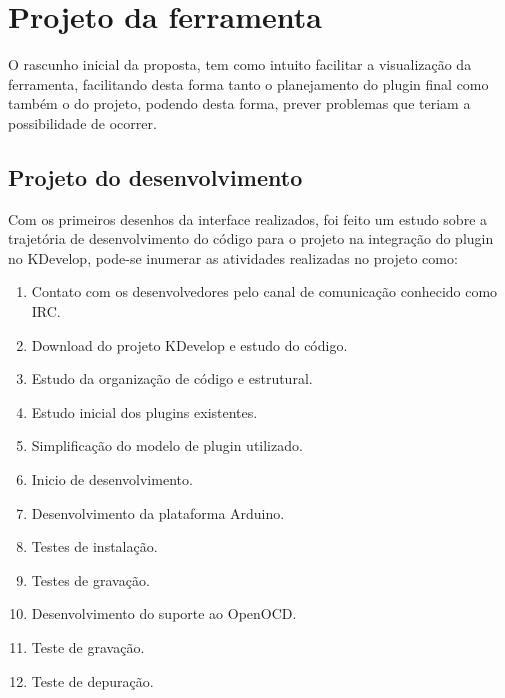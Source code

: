 \chapter{Projeto da ferramenta}
O rascunho inicial da proposta, tem como intuito facilitar a visualização da ferramenta, facilitando desta forma tanto o planejamento do plugin final como também o do projeto, podendo desta forma, prever problemas que teriam a possibilidade de ocorrer.



\section{Projeto do desenvolvimento}
Com os primeiros desenhos da interface realizados, foi feito um estudo sobre a trajetória de desenvolvimento do código para o projeto na integração do plugin no KDevelop, pode-se inumerar as atividades realizadas no projeto como:

\begin{enumerate}
 \item Contato com os desenvolvedores pelo canal de comunicação conhecido como IRC.
 \item Download do projeto KDevelop e estudo do código.
 \item Estudo da organização de código e estrutural.
 \item Estudo inicial dos plugins existentes.
 \item Simplificação do modelo de plugin utilizado.
 \item Inicio de desenvolvimento.
 \item Desenvolvimento da plataforma Arduino.
 \item Testes de instalação.
 \item Testes de gravação.
 \item Desenvolvimento do suporte ao  OpenOCD.
 \item Teste de gravação.
 \item Teste de depuração.
\end{enumerate}

